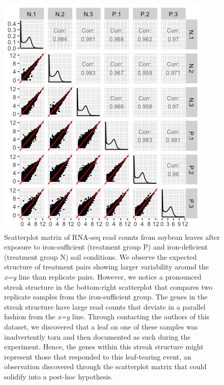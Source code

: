\documentclass{bioinfo}
\begin{document}
\begin{figure}[!tpb]
\centerline{\includegraphics[width=\columnwidth]{../MakeFigures/sbIRStreak.jpg}}
\caption{Scatterplot matrix of RNA-seq read counts from soybean leaves after exposure to iron-sufficient (treatment group P) and iron-deficient (treatment group N) soil conditions. We observe the expected structure of treatment pairs showing larger variability around the \textit{x=y} line than replicate pairs. However, we notice a pronounced streak structure in the bottom-right scatterplot that compares two replicate samples from the iron-sufficient group. The genes in the streak structure have large read counts that deviate in a parallel fashion from the \textit{x=y} line. Through contacting the authors of this dataset, we discovered that a leaf on one of these samples was inadvertently torn and then documented as such during the experiment. Hence, the genes within this streak structure might represent those that responded to this leaf-tearing event, an observation discovered through the scatterplot matrix that could solidify into a post-hoc hypothesis.
\label{structure}}
\end{figure}
\end{document}
